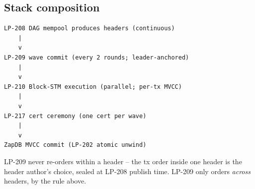 \subsection{Stack composition}

\begin{verbatim}
LP-208 DAG mempool produces headers (continuous)
    |
    v
LP-209 wave commit (every 2 rounds; leader-anchored)
    |
    v
LP-210 Block-STM execution (parallel; per-tx MVCC)
    |
    v
LP-217 cert ceremony (one cert per wave)
    |
    v
ZapDB MVCC commit (LP-202 atomic unwind)
\end{verbatim}

LP-209 never re-orders within a header -- the tx order inside one
header is the header author's choice, sealed at LP-208 publish
time. LP-209 only orders \emph{across} headers, by the rule above.
